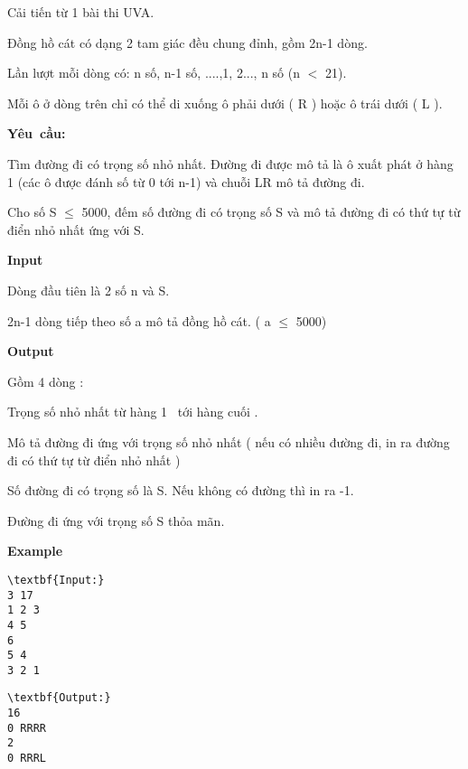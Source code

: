 

Cải tiến từ 1 bài thi UVA.

Đồng hồ cát có dạng 2 tam giác đều chung đỉnh, gồm 2n-1 dòng.

Lần lượt mỗi dòng có: n số, n-1 số, ....,1, 2..., n số (n $<$ 21).

Mỗi ô ở dòng trên chỉ có thể di xuống ô phải dưới ( R ) hoặc ô trái dưới ( L ).

\textbf{Yêu cầu:}

Tìm đường đi có trọng số nhỏ nhất. Đường đi được mô tả là ô xuất phát ở hàng 1 (các ô được đánh số từ 0 tới n-1) và chuỗi LR mô tả đường đi.

Cho số S  $\le$  5000, đếm số đường đi có trọng số S và mô tả đường đi có thứ tự từ điển nhỏ nhất ứng với S.

\textbf{Input}

Dòng đầu tiên là 2 số n và S.

2n-1 dòng tiếp theo số a mô tả đồng hồ cát. ( a $\le$ 5000)

\textbf{Output }

Gồm 4 dòng :

Trọng số nhỏ nhất từ hàng 1  tới hàng cuối .

Mô tả đường đi ứng với trọng số nhỏ nhất ( nếu có nhiều đường đi, in ra đường đi có thứ tự từ điển nhỏ nhất )

Số đường đi có trọng số là S. Nếu không có đường thì in ra -1.

Đường đi ứng với trọng số S thỏa mãn.

\textbf{Example}
\begin{verbatim}
\textbf{Input:}
3 17
1 2 3
4 5
6
5 4
3 2 1\end{verbatim}
\begin{verbatim}
\textbf{Output:}
16
0 RRRR
2
0 RRRL\end{verbatim}
